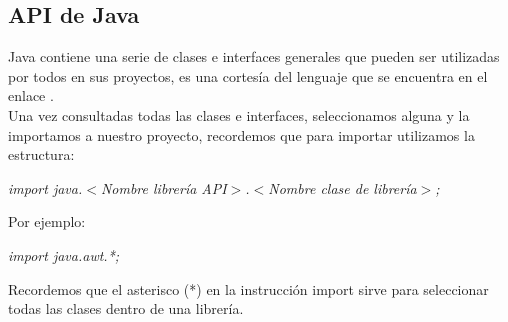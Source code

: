 \subsection{API de Java}
Java contiene una serie de clases e interfaces generales que pueden ser utilizadas por todos en sus proyectos, es una cortesía del lenguaje que se encuentra en el enlace .\\
Una vez consultadas todas las clases e interfaces, seleccionamos alguna y la importamos a nuestro proyecto, recordemos que para importar utilizamos la estructura:\begin{center}\textit{import java.$<$Nombre librería API$>$.$<$Nombre clase de librería$>$;}\end{center}
Por ejemplo:\begin{center}\textit{import java.awt.*;}\end{center}
Recordemos que el asterisco (*) en la instrucción import sirve para seleccionar todas las clases dentro de una librería.



